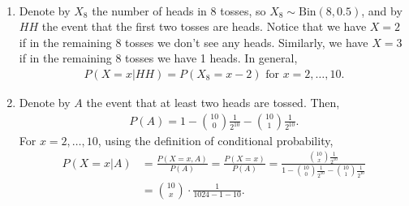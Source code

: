 
\setcounter{theorem}{21}
\begin{exercise}[BH.3.24]
\begin{solution}~
	\begin{enumerate}
	    \item Denote by $X_{8}$ the number of heads in $8$ tosses, so $X_{8}\sim \text{Bin}(8,0.5)$, and by $HH$ the event that the first two tosses are heads. Notice that we have $X=2$ if in the remaining 8 tosses we don't see any heads. Similarly, we have $X=3$ if in the remaining 8 tosses we have 1 heads. In general, 
        \begin{align*}
        	P(X=x|HH) = P(X_{8}=x-2) \text{  for } x=2,\ldots,10.
        \end{align*}
        \item Denote by $A$ the event that at least two heads are tossed. Then,
        \begin{align*}
        	P(A) = 1-{10 \choose 0}\frac{1}{2^{10}}-{10 \choose 1}\frac{1}{2^{10}}.
        \end{align*} For $x=2,\ldots,10$, using the definition of conditional probability,
        \begin{align*}
        	P(X=x|A) &=\frac{P(X=x,A)}{P(A)} = \frac{P(X=x)}{P(A)} = \frac{{10 \choose x}\frac{1}{2^{10}}}{1-{10 \choose 0}\frac{1}{2^{10}}-{10 \choose 1}\frac{1}{2^{10}}}\\
        	&={10 \choose x}\cdot \frac{1}{1024-1-10}.
        \end{align*}
	\end{enumerate}
\end{solution}
\end{exercise}


